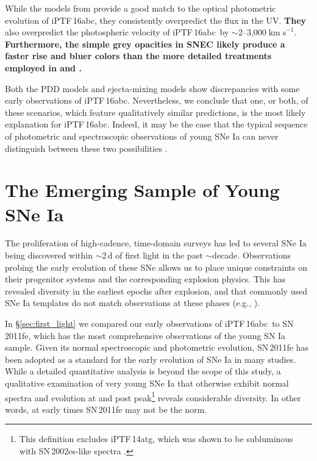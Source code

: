 \documentclass[twocolumn]{aastex61}
\newcommand{\abc}{iPTF\,16abc}
\newcommand{\sneia}{SNe Ia}
\begin{document}
While the models from \citet{2016ApJ...826...96P} provide a good match to the
optical photometric evolution of \abc, they consistently overpredict the flux
in the UV. \textbf{They} also overpredict the photospheric velocity of \abc\
by $\sim$2--3,000$\; \mathrm{km \; s}^{-1}$. \textbf{Furthermore, the simple
grey opacities in SNEC likely produce a faster rise and bluer colors than the
more detailed treatments employed in \citet{2014MNRAS.441..532D} and
\citet{2017MNRAS.472.2787N}.}

Both the PDD models and ejecta-mixing models show discrepancies with some
early observations of \abc. Nevertheless, we conclude that one, or both, of
these scenarios, which feature qualitatively similar predictions, is the most
likely explanation for \abc. Indeed, it may be the case that the typical
sequence of photometric and spectroscopic observations of young SNe Ia can
never distinguish between these two possibilities \citep{2017MNRAS.472.2787N}.

\section{\textbf{The Emerging Sample of Young \sneia}}

The proliferation of high-cadence, time-domain surveys has led to several SNe
Ia being discovered within $\sim$2\,d of first light in the past $\sim$decade.
Observations probing the early evolution of these SNe allows us to place
unique constraints on their progenitor systems and the corresponding explosion
physics. This has revealed diversity in the earliest epochs after explosion,
and that commonly used SNe Ia templates do not match observations at these
phases (e.g., \citealt{2012ApJ...744...38F}).

In \S\ref{sec:first_light} we compared our early observations of \abc\ to
SN\,2011fe, which has the most comprehensive observations of the young SN Ia
sample. Given its normal spectroscopic and photometric evolution, SN\,2011fe
has been adopted as a standard for the early evolution of SNe Ia in many
studies. While a detailed quantitative analysis is beyond the scope of this
study, a qualitative examination of very young SNe Ia that otherwise exhibit
normal spectra and evolution at and post peak\footnote{This definition
excludes iPTF\,14atg, which was shown to be subluminous with SN\,2002es-like
spectra \citep{2015Natur.521..328C}.} reveals considerable diversity. In other
words, at early times SN\,2011fe may not be the norm.
\end{document}
